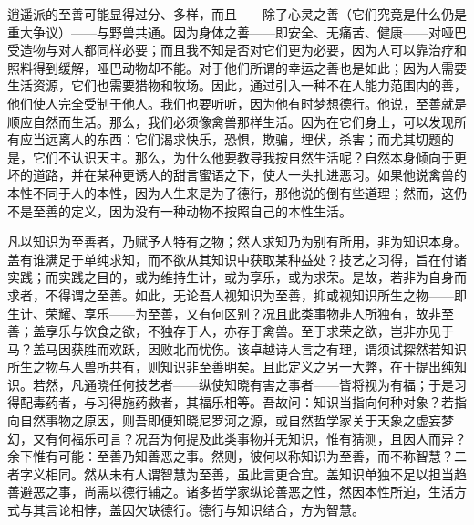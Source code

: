 逍遥派的至善可能显得过分、多样，而且——除了心灵之善（它们究竟是什么仍是重大争议）——与野兽共通。因为身体之善——即安全、无痛苦、健康——对哑巴受造物与对人都同样必要；而且我不知是否对它们更为必要，因为人可以靠治疗和照料得到缓解，哑巴动物却不能。对于他们所谓的幸运之善也是如此；因为人需要生活资源，它们也需要猎物和牧场。因此，通过引入一种不在人能力范围内的善，他们使人完全受制于他人。我们也要听听，因为他有时梦想德行。他说，至善就是顺应自然而生活。那么，我们必须像禽兽那样生活。因为在它们身上，可以发现所有应当远离人的东西：它们渴求快乐，恐惧，欺骗，埋伏，杀害；而尤其切题的是，它们不认识天主。那么，为什么他要教导我按自然生活呢？自然本身倾向于更坏的道路，并在某种更诱人的甜言蜜语之下，使人一头扎进恶习。如果他说禽兽的本性不同于人的本性，因为人生来是为了德行，那他说的倒有些道理；然而，这仍不是至善的定义，因为没有一种动物不按照自己的本性生活。\par

凡以知识为至善者，乃赋予人特有之物；然人求知乃为别有所用，非为知识本身。盖有谁满足于单纯求知，而不欲从其知识中获取某种益处？技艺之习得，旨在付诸实践；而实践之目的，或为维持生计，或为享乐，或为求荣。是故，若非为自身而求者，不得谓之至善。如此，无论吾人视知识为至善，抑或视知识所生之物——即生计、荣耀、享乐——为至善，又有何区别？况且此类事物非人所独有，故非至善；盖享乐与饮食之欲，不独存于人，亦存于禽兽。至于求荣之欲，岂非亦见于马？盖马因获胜而欢跃，因败北而忧伤。该卓越诗人言之有理，谓须试探然若知识所生之物与人兽所共有，则知识非至善明矣。且此定义之另一大弊，在于提出纯知识。若然，凡通晓任何技艺者——纵使知晓有害之事者——皆将视为有福；于是习得配毒药者，与习得施药救者，其福乐相等。吾故问：知识当指向何种对象？若指向自然事物之原因，则吾即便知晓尼罗河之源，或自然哲学家关于天象之虚妄梦幻，又有何福乐可言？况吾为何提及此类事物并无知识，惟有猜测，且因人而异？余下惟有可能：至善乃知善恶之事。然则，彼何以称知识为至善，而不称智慧？二者字义相同。然从未有人谓智慧为至善，虽此言更合宜。盖知识单独不足以担当趋善避恶之事，尚需以德行辅之。诸多哲学家纵论善恶之性，然因本性所迫，生活方式与其言论相悖，盖因欠缺德行。德行与知识结合，方为智慧。\par

